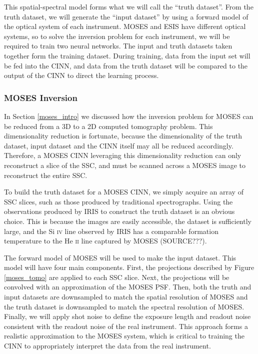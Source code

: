 \documentclass[10pt, letter]{article}
\begin{document}
			This spatial-spectral model forms what we will call the ``truth dataset''. From the truth dataset, we will generate the ``input dataset'' by using a forward model of the optical system of each instrument. MOSES and ESIS have different optical systems, so to solve the inversion problem for each instrument, we will be required to train two neural networks. The input and truth datasets taken together form the training dataset. During training, data from the input set will be fed into the CINN, and data from the truth dataset will be compared to the output of the CINN to direct the learning process.
			
			\subsubsection{MOSES Inversion} \label{moses_inv}
			
				In Section \ref{moses_intro} we discussed how the inversion problem for MOSES can be reduced from a 3D to a 2D computed tomography problem. This dimensionality reduction is fortunate, because the dimensionality of the truth dataset, input dataset and the CINN itself may all be reduced accordingly. Therefore, a MOSES CINN leveraging this dimensionality reduction can only reconstruct a slice of the SSC, and must be scanned across a MOSES image to reconstruct the entire SSC.
				
				To build the truth dataset for a MOSES CINN, we simply acquire an array of SSC slices, such as those produced by traditional spectrographs. Using the observations produced by IRIS to construct the truth dataset is an obvious choice. This is because the images are easily accessible, the dataset is sufficiently large, and the Si \textsc{iv} line observed by IRIS has a comparable formation temperature to the He \textsc{ii} line captured by MOSES (SOURCE???).
			
				The forward model of MOSES will be used to make the input dataset. This model will have four main components. First, the projections described by Figure \ref{moses_tomo} are applied to each SSC slice. Next, the projections will be convolved with an approximation of the MOSES PSF. Then, both the truth and input datasets are downsampled to match the spatial resolution of MOSES and the truth dataset is downsampled to match the spectral resolution of MOSES. Finally, we will apply shot noise to define the exposure length and readout noise consistent with the readout noise of the real instrument. This approach forms a realistic approximation to the MOSES system, which is critical to training the CINN to appropriately interpret the data from the real instrument.
			
\end{document}
